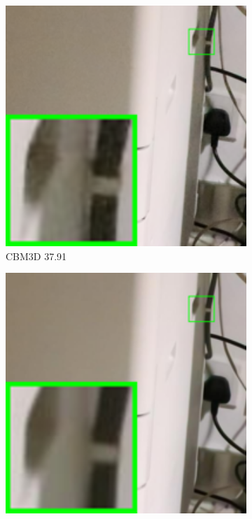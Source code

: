 \begin{figure}
\begin{subfigure}[t]{0.19\textwidth}
        \includegraphics[width=1\textwidth]{images/guided/resize_br_CBM3D_Canon_80D_ISO12800_IMG_2321_part2.png}
		\caption{CBM3D 37.91}
    \end{subfigure}
    \hfill
    \begin{subfigure}[t]{0.19\textwidth}
        \centering
        \includegraphics[width=1\textwidth]{images/guided/resize_br_WNNM_Canon_80D_ISO12800_IMG_2321_part2.png}

\end{subfigure}
\end{figure}
